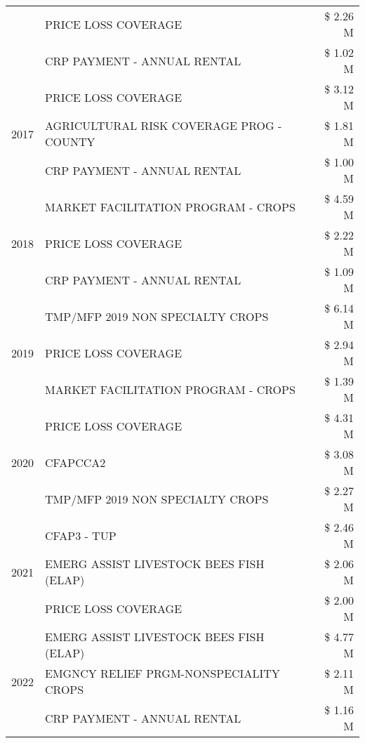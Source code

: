 \begin{tabular}{llr}
 & PRICE LOSS COVERAGE & \$ 2.26 M \\
 & CRP PAYMENT - ANNUAL RENTAL & \$ 1.02 M \\
\cline{1-3}
\multirow[t]{3}{*}{2017} & PRICE LOSS COVERAGE & \$ 3.12 M \\
 & AGRICULTURAL RISK COVERAGE PROG - COUNTY & \$ 1.81 M \\
 & CRP PAYMENT - ANNUAL RENTAL & \$ 1.00 M \\
\cline{1-3}
\multirow[t]{3}{*}{2018} & MARKET FACILITATION PROGRAM - CROPS & \$ 4.59 M \\
 & PRICE LOSS COVERAGE & \$ 2.22 M \\
 & CRP PAYMENT - ANNUAL RENTAL & \$ 1.09 M \\
\cline{1-3}
\multirow[t]{3}{*}{2019} & TMP/MFP 2019 NON SPECIALTY CROPS & \$ 6.14 M \\
 & PRICE LOSS COVERAGE & \$ 2.94 M \\
 & MARKET FACILITATION PROGRAM - CROPS & \$ 1.39 M \\
\cline{1-3}
\multirow[t]{3}{*}{2020} & PRICE LOSS COVERAGE & \$ 4.31 M \\
 & CFAPCCA2 & \$ 3.08 M \\
 & TMP/MFP 2019 NON SPECIALTY CROPS & \$ 2.27 M \\
\cline{1-3}
\multirow[t]{3}{*}{2021} & CFAP3 - TUP & \$ 2.46 M \\
 & EMERG ASSIST LIVESTOCK BEES FISH (ELAP) & \$ 2.06 M \\
 & PRICE LOSS COVERAGE & \$ 2.00 M \\
\cline{1-3}
\multirow[t]{3}{*}{2022} & EMERG ASSIST LIVESTOCK BEES FISH (ELAP) & \$ 4.77 M \\
 & EMGNCY RELIEF PRGM-NONSPECIALITY CROPS & \$ 2.11 M \\
 & CRP PAYMENT - ANNUAL RENTAL & \$ 1.16 M \\
\cline{1-3}
\bottomrule
\end{tabular}
